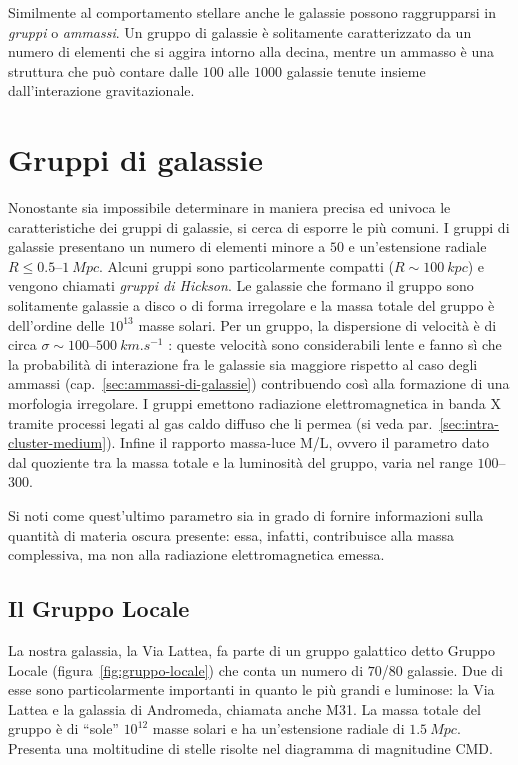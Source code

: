 Similmente al comportamento stellare anche le galassie possono raggrupparsi in \emph{gruppi} o \emph{ammassi}.
Un gruppo di galassie è solitamente caratterizzato da un numero di elementi che si aggira intorno alla decina, mentre un ammasso è una struttura che può contare dalle $100$ alle $1000$ galassie tenute insieme dall’interazione gravitazionale.

\section{Gruppi di galassie}\label{sec:gruppi-di-galassie}
Nonostante sia impossibile determinare in maniera precisa ed univoca le caratteristiche dei gruppi di galassie, si cerca di esporre le più comuni. 
I gruppi di galassie presentano un numero di elementi minore a $50$ e un’estensione radiale $R \leq 0.5$--$\SI{1}{Mpc}$. Alcuni gruppi sono particolarmente compatti ($R \sim \SI{100}{kpc}$) e vengono chiamati \emph{gruppi di Hickson}. 
Le galassie che formano il gruppo sono solitamente galassie a disco o di forma irregolare e la massa totale del gruppo è dell’ordine delle $10^{13}$ masse solari. 
Per un gruppo, la dispersione di velocità è di circa $\sigma \sim 100$--$\SI{500}{km.s^{-1}}$ : queste velocità sono considerabili lente e fanno sì che la probabilità di interazione fra le galassie sia maggiore rispetto al caso degli ammassi (cap.~\ref{sec:ammassi-di-galassie}) contribuendo così alla formazione di una morfologia irregolare.
I gruppi emettono radiazione elettromagnetica in banda X tramite processi legati al gas caldo diffuso che li permea (si veda par.~\ref{sec:intra-cluster-medium}).
Infine il rapporto massa-luce M/L, ovvero il parametro dato dal quoziente tra la massa totale e la luminosità del gruppo, varia nel range $100$--$300$.

\noindent Si noti come quest’ultimo parametro sia in grado di fornire informazioni sulla quantità di materia oscura presente: essa, infatti, contribuisce alla massa complessiva, ma non alla radiazione elettromagnetica emessa. 
\subsection{Il Gruppo Locale}
La nostra galassia, la Via Lattea, fa parte di un gruppo galattico detto Gruppo Locale (figura~\ref{fig:gruppo-locale}) che conta un numero di $70$/$80$ galassie. Due di esse sono particolarmente importanti in quanto le più grandi e luminose: la Via Lattea e la galassia di Andromeda, chiamata anche M31.
La massa totale del gruppo è di “sole” $10^{12}$ masse solari e ha un’estensione radiale di $\SI{1.5}{Mpc}$.
Presenta una moltitudine di stelle risolte nel diagramma di magnitudine CMD.

